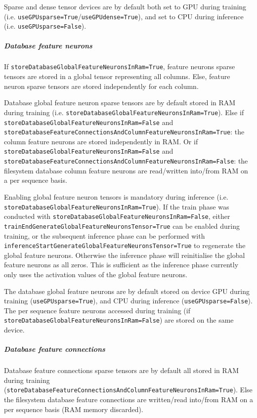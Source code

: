 Sparse and dense tensor devices are by default both set to GPU during training (i.e. \texttt{useGPUsparse=True}/\texttt{useGPUdense=True}), and set to CPU during inference (i.e. \texttt{useGPUsparse=False}). 

\subparagraph{Database feature neurons}
If \texttt{storeDatabaseGlobalFeatureNeuronsInRam=True}, feature neurons sparse tensors are stored in a global tensor representing all columns. Else, feature neuron sparse tensors are stored independently for each column. 

Database global feature neuron sparse tensors are by default stored in RAM during training (i.e. \texttt{storeDatabaseGlobalFeatureNeuronsInRam=True}). Else if \texttt{storeDatabaseGlobalFeatureNeuronsInRam=False} and \texttt{storeDatabaseFeatureConnectionsAndColumnFeatureNeuronsInRam=True}: the column feature neurons are stored independently in RAM. Or if \texttt{storeDatabaseGlobalFeatureNeuronsInRam=False} and \texttt{storeDatabaseFeatureConnectionsAndColumnFeatureNeuronsInRam=False}: the filesystem database column feature neurons are read/written into/from RAM on a per sequence basis. 

Enabling global feature neuron tensors is mandatory during inference (i.e. \texttt{storeDatabaseGlobalFeatureNeuronsInRam=True}). If the train phase was conducted with \texttt{storeDatabaseGlobalFeatureNeuronsInRam=False}, either \texttt{trainEndGenerateGlobalFeatureNeuronsTensor=True} can be enabled during training, or the subsequent inference phase can be performed with \texttt{inferenceStartGenerateGlobalFeatureNeuronsTensor=True} to regenerate the global feature neurons. Otherwise the inference phase will reinitialise the global feature neurons as all zeros. This is sufficient as the inference phase currently only uses the activation values of the global feature neurons. 

The database global feature neurons are by default stored on device GPU during training (\texttt{useGPUsparse=True}), and CPU during inference (\texttt{useGPUsparse=False}). The per sequence feature neurons accessed during training (if \texttt{storeDatabaseGlobalFeatureNeuronsInRam=False}) are stored on the same device.

\subparagraph{Database feature connections}
Database feature connections sparse tensors are by default all stored in RAM during training (\texttt{storeDatabaseFeatureConnectionsAndColumnFeatureNeuronsInRam=True}). Else the filesystem database feature connections are written/read into/from RAM on a per sequence basis (RAM memory discarded).

